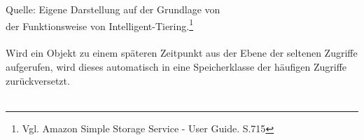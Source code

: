 Quelle: Eigene Darstellung auf der Grundlage von \\
der Funktionsweise von Intelligent-Tiering.\footnote{Vgl. Amazon Simple Storage Service - User Guide. S.715\cite{AMZ18}}
\\\\
Wird ein Objekt zu einem späteren Zeitpunkt aus der Ebene der seltenen Zugriffe aufgerufen, wird dieses automatisch in eine Speicherklasse der häufigen Zugriffe zurückversetzt.
\\\\
